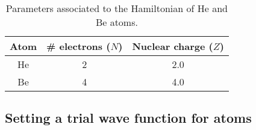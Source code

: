 \begin{table}[h]
\begin{center}
\begin{tabular}{ccc}
\hline
 Atom & \# electrons ($N$) & Nuclear charge ($Z$) \\
\hline
He & 2  &  2.0 \\
Be & 4 & 4.0 \\
\hline
\end{tabular}
\caption{Parameters associated to the Hamiltonian of He and Be atoms.}
\label{HeBeData}
\end{center}
\end{table}


\subsection{Setting a trial wave function for atoms}

